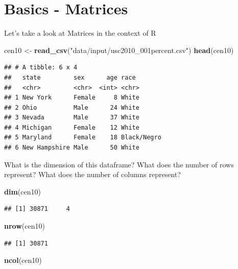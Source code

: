 \documentclass[]{book}
\newenvironment{Shaded}{\begin{snugshade}}{\end{snugshade}}
\newcommand{\KeywordTok}[1]{\textcolor[rgb]{0.13,0.29,0.53}{\textbf{#1}}}
\newcommand{\NormalTok}[1]{#1}
\newcommand{\StringTok}[1]{\textcolor[rgb]{0.31,0.60,0.02}{#1}}
\theoremstyle{definition}
\theoremstyle{definition}
\theoremstyle{definition}
\theoremstyle{remark}
\begin{document}
\hypertarget{basics---matrices}{%
\section{Basics - Matrices}\label{basics---matrices}}

Let's take a look at Matrices in the context of R

\begin{Shaded}
\begin{Highlighting}[]
\NormalTok{cen10 <-}\StringTok{ }\KeywordTok{read_csv}\NormalTok{(}\StringTok{"data/input/usc2010_001percent.csv"}\NormalTok{)}
\KeywordTok{head}\NormalTok{(cen10)}
\end{Highlighting}
\end{Shaded}

\begin{verbatim}
## # A tibble: 6 x 4
##   state         sex      age race       
##   <chr>         <chr>  <int> <chr>      
## 1 New York      Female     8 White      
## 2 Ohio          Male      24 White      
## 3 Nevada        Male      37 White      
## 4 Michigan      Female    12 White      
## 5 Maryland      Female    18 Black/Negro
## 6 New Hampshire Male      50 White
\end{verbatim}

What is the dimension of this dataframe? What does the number of rows represent? What does the number of columns represent?

\begin{Shaded}
\begin{Highlighting}[]
\KeywordTok{dim}\NormalTok{(cen10)}
\end{Highlighting}
\end{Shaded}

\begin{verbatim}
## [1] 30871     4
\end{verbatim}

\begin{Shaded}
\begin{Highlighting}[]
\KeywordTok{nrow}\NormalTok{(cen10)}
\end{Highlighting}
\end{Shaded}

\begin{verbatim}
## [1] 30871
\end{verbatim}

\begin{Shaded}
\begin{Highlighting}[]
\KeywordTok{ncol}\NormalTok{(cen10)}
\end{Highlighting}
\end{Shaded}
\end{document}
